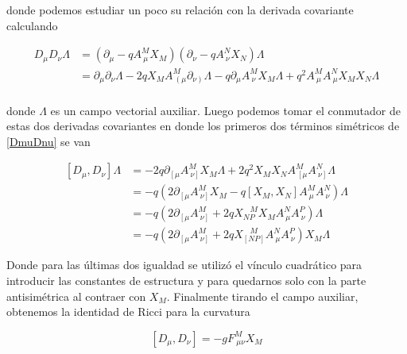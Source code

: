\documentclass{article}
\numberwithin{equation}{section}
\begin{document}
donde podemos estudiar un poco su relación con la derivada covariante calculando


\begin{equation}\label{DmuDnu}
\begin{aligned}
D_{\mu}D_{\nu} \Lambda &= \left( \partial_{\mu} - q A^M_{\ \mu} X_M\right) \left( \partial_{\nu} - q A^N_{\ \nu} X_N\right) \Lambda\\
&= \partial_{\mu} \partial_{\nu} \Lambda - 2q X_M A^M_{\ \left( \mu \right.} \partial_{\left. \nu\right)} \Lambda - q \partial_{\mu} A^M_{\ \nu} X_M \Lambda + q^2 A^M_{\ \mu} A^N_{\ \mu} X_M X_N \Lambda\\
\end{aligned}
\end{equation}

donde $ \Lambda $ es un campo vectorial auxiliar. Luego podemos tomar el conmutador de estas dos derivadas covariantes en donde los primeros dos términos simétricos de \ref{DmuDnu} se van

\begin{equation}
\begin{aligned}
\left[D_{\mu}, D_{\nu}\right] \Lambda &= -2 q  \partial_{\left[ \mu\right.} A^M_{\ \left. \nu \right]} X_M \Lambda + 2 q^2 X_M X_N A^M_{\ \left[ \mu \right.} A^N_{\ \left. \nu\right]} \Lambda\\
&= -q \left( 2 \partial_{\left[ \mu\right.} A^M_{\ \left. \nu \right]} X_M  - q \left[X_M, X_N\right] A^M_{\ \mu} A^N_{\ \nu} \right) \Lambda\\
&= -q \left( 2 \partial_{\left[ \mu\right.} A^M_{\ \left. \nu \right]} + 2q X_{N P}^{\ \ \ \ M} X_M A^N_{\ \mu} A^P_{\ \nu} \right)  \Lambda\\
&=-q \left( 2 \partial_{\left[ \mu\right.} A^M_{\ \left. \nu \right]} + 2q X_{\left[N P\right]}^{\ \ \ \ M}  A^N_{\ \mu} A^P_{\ \nu} \right) X_M \Lambda
\end{aligned}
\end{equation}

Donde para las últimas dos igualdad se utilizó el vínculo cuadrático para introducir las constantes de estructura y para quedarnos solo con la parte antisimétrica al contraer con $ X_M $. Finalmente tirando el campo auxiliar, obtenemos la identidad de Ricci para la curvatura

\begin{boxquation}
\begin{equation}\label{Ricciidentity}
\left[D_{\mu}, D_{\nu}\right] = -g F^M_{\ \mu \nu} X_M 
\end{equation}
\end{boxquation}
\end{document}
